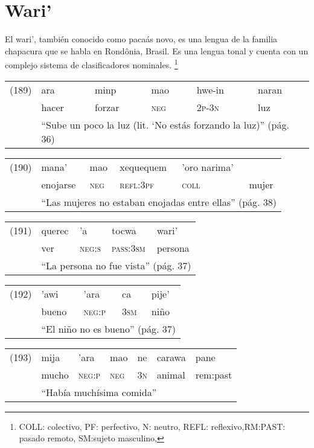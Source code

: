 \section*{Wari'}

\noindent El wari', también conocido como pacaás novo, es una lengua de la familia chapacura que se habla en Rondônia, Brasil. Es una lengua tonal y cuenta con un complejo sistema de clasificadores nominales.
\footnote{COLL: colectivo, PF: perfectivo, N: neutro, REFL: reflexivo,RM:PAST: pasado remoto, SM:sujeto masculino, }
\vspace{0.5cm}

{\setmainfont{Charis SIL} 

\begin{tabular}{llllll}
(189) & ara & minp & mao & hwe-in & naran \\
& hacer & forzar & \textsc{neg} & \textsc{2p-3n} & luz \\
& \multicolumn{5}{l}{``Sube un poco la luz (lit. ‘No estás forzando la luz)'' (pág. 36)}
\end{tabular} \vspace{0.5cm}

\begin{tabular}{llllll}
(190) & mana' & mao & xequequem & 'oro narima' \\
& enojarse & \textsc{neg} & \textsc{refl:3pf} & \textsc{coll} & mujer \\
& \multicolumn{5}{l}{``Las mujeres no estaban enojadas entre ellas'' (pág. 38)}
\end{tabular} \vspace{0.5cm}

\begin{tabular}{lllll}
(191) & querec & 'a & tocwa & wari' \\
& ver & \textsc{neg:s} & \textsc{pass:3sm} & persona \\
& \multicolumn{4}{l}{``La persona no fue vista'' (pág. 37)}
\end{tabular} \vspace{0.5cm}

\begin{tabular}{lllll}
(192) & 'awi & 'ara & ca & pije' \\
& bueno & \textsc{neg:p} & \textsc{3sm} & niño \\
& \multicolumn{4}{l}{``El niño no es bueno'' (pág. 37)}
\end{tabular} \vspace{0.5cm}

\begin{tabular}{lllllll}
(193) & mija & 'ara & mao & ne & carawa & pane \\
& mucho & \textsc{neg:p} & \textsc{neg} & \textsc{3n} & animal & rem:past \\
& \multicolumn{6}{l}{``Había muchísima comida''}
\end{tabular} \vspace{0.5cm}

}

